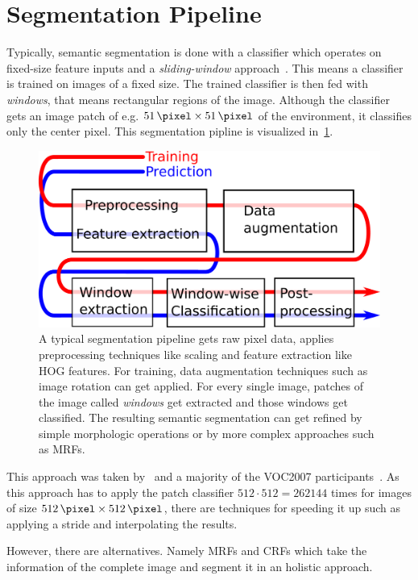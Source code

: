 
\section{Segmentation Pipeline}

Typically, semantic segmentation is done with a classifier which operates on
fixed-size feature inputs and a \textit{sliding-window}
approach~\cite{1467360,5490399,schroff2008object}. This means a classifier is
trained on images of a fixed size. The trained classifier is then fed with
\textit{windows}, that means rectangular regions of the image. Although the
classifier gets an image patch of e.g. $\SI{51}{\pixel} \times \SI{51}{\pixel}$
of the environment, it classifies only the center pixel. This segmentation
pipline is visualized in~\cref{fig:segmentation-pipeline}.

\begin{figure}
    \centering
    \includegraphics[width=\linewidth, keepaspectratio]{figures/segmentation-pipeline.pdf}
    \caption{A typical segmentation pipeline gets raw pixel data, applies
             preprocessing techniques like scaling and feature extraction like
             HOG features. For training, data augmentation techniques such as
             image rotation can get applied. For every single image, patches
             of the image called \textit{windows} get extracted and those
             windows get classified. The resulting semantic segmentation can
             get refined by simple morphologic operations or by more complex
             approaches such as \glspl{MRF}.}
    \label{fig:segmentation-pipeline}
\end{figure}


This approach was taken by~\cite{bittel2015pixel} and a majority of the VOC2007
participants~\cite{pascal-voc-2007}. As this approach has to apply the patch
classifier $512 \cdot 512 = \num{262144}$ times for images of size
$\SI{512}{\pixel} \times \SI{512}{\pixel}$, there are techniques for speeding
it up such as applying a stride and interpolating the results.

However, there are alternatives. Namely \glspl{MRF} and \glspl{CRF}
which take the information of the complete image and segment it in an holistic
approach.
